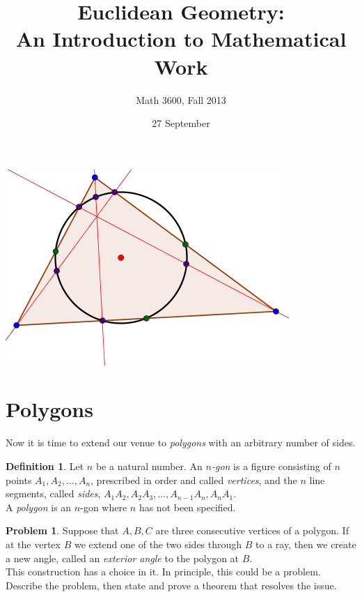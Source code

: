\documentclass{tufte-handout}
\title{Euclidean Geometry:\\An Introduction to Mathematical Work}
\author[]{Math 3600, Fall 2013}
\date{27 September}
\theoremstyle{definition}
\newtheorem{problem}{Problem}[section]
\newtheorem*{definition}{Definition}
\begin{document}
\maketitle
\begin{marginfigure}
    \includegraphics{NPC}
\end{marginfigure}

\setcounter{section}{5}

\section{Polygons}
Now it is time to extend our venue to \emph{polygons} with an arbitrary number of sides.

\begin{definition}\label{defn:n-gon}
Let $n$ be a natural number. An \emph{$n$-gon} is a figure consisting of $n$ points $A_1, A_2, \ldots, A_n$, prescribed in order and called \emph{vertices}, and the $n$ line segments, called \emph{sides}, $A_1A_2, A_2A_3, \ldots, A_{n-1}A_n, A_nA_1$.\\
A \emph{polygon} is an $n$-gon where $n$ has not been specified.
\end{definition}



\begin{problem}\label{prob:exterior-angle}
Suppose that $A,B,C$ are three consecutive vertices of a polygon. 
If at the vertex $B$ we extend one of the two sides through $B$ to a ray, then we create a new angle, called an \emph{exterior angle} to the polygon at $B$.\\
This construction has a choice in it. 
In principle, this could be a problem. 
Describe the problem, then state and prove a theorem that resolves the issue.
\end{problem}
\end{document}
